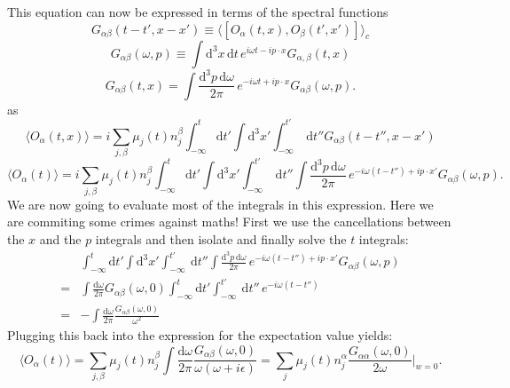 \documentclass[master,       %
               twoside,        %
               BCOR10mm,       %
               english,ngerman, %
               ]{GAUBM}
\begin{document}
\begin{otherlanguage}{english}
\begin{equation}
\end{equation}
This equation can now be expressed in terms of the spectral functions
\begin{equation}
	G_{\alpha \beta}(t - t', x - x') \equiv \langle [ O_\alpha(t, x), O_\beta(t', x')] \rangle_{c}
\end{equation}
\begin{equation}G_{\alpha \beta}(\omega, p) \equiv \int \mathrm{d}^3 x \, \mathrm{d} t \, e^{i \omega t - i p \cdot x} G_{\alpha, \beta}(t, x)
\end{equation}
\begin{equation}G_{\alpha \beta}(t, x) = \int \frac{\mathrm{d}^3 p \, \mathrm{d} \omega}{2 \pi} \, e^{- i \omega t + i p \cdot x} G_{\alpha \beta}(\omega, p).
\end{equation}
as
\begin{equation}
	\langle O_\alpha(t, x) \rangle = i \sum_{j, \beta} \mu_j(t) n^\beta_j  \int_{-\infty}^t \mathrm{d} t' \int \mathrm{d}^3 x' \int^{t'}_{-\infty} \ \mathrm{d} t'' G_{\alpha \beta}(t - t'', x - x')
\end{equation}
\begin{equation}
	\langle O_\alpha(t) \rangle = i \sum_{j, \beta} \mu_j(t) n^\beta_j  \int_{-\infty}^t \mathrm{d} t' \int \mathrm{d}^3 x' \int^{t'}_{-\infty} \ \mathrm{d} t''
	\int \frac{\mathrm{d}^3 p \, \mathrm{d} \omega}{2 \pi} \, e^{- i \omega (t - t'') + i p \cdot x'} G_{\alpha \beta}(\omega, p).
\end{equation}
We are now going to evaluate most of the integrals in this expression. Here we are commiting some crimes against maths! First we use the cancellations between the $x$ and the $p$ integrals and then isolate and finally solve the $t$ integrals:
\begin{align}
	& \int_{-\infty}^t \mathrm{d} t' \int \mathrm{d}^3 x' \int^{t'}_{-\infty} \ \mathrm{d} t''
	\int \frac{\mathrm{d}^3 p \, \mathrm{d} \omega}{2 \pi} \, e^{- i \omega (t - t'') + i p \cdot x'} G_{\alpha \beta}(\omega, p) \nonumber \\
	= & \int \frac{\mathrm{d} \omega}{2 \pi} G_{\alpha \beta}(\omega, 0) \int_{-\infty}^t \mathrm{d} t' \int^{t'}_{-\infty} \ \mathrm{d} t''
	\, e^{- i \omega (t - t'')}  \nonumber \\
	= & - \int \frac{\mathrm{d} \omega}{2 \pi} \frac{G_{\alpha \beta}(\omega, 0)} {\omega^2}
\end{align}
Plugging this back into the expression for the expectation value yields:
\begin{equation}
	\langle O_\alpha(t) \rangle = \sum_{j, \beta} \mu_j(t) n^\beta_j \int \frac{\mathrm{d} \omega}{2 \pi} \frac{G_{\alpha \beta}(\omega, 0)} { \omega (\omega + i \epsilon)} =  \sum_{j} \mu_j(t) n^\alpha_j \frac{G_{\alpha \alpha}(\omega, 0)}{2 \omega} \Big|_{w = 0}.

\end{equation}
\end{otherlanguage}
\end{document}
